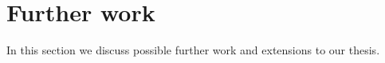 \section{Further work }

In this section we discuss possible further work and extensions to our thesis.






